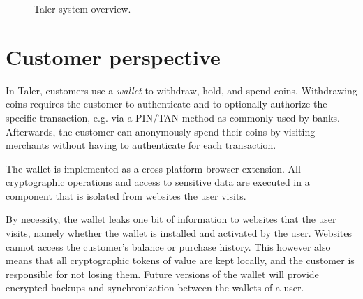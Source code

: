 \documentclass[twoside,letterpaper]{sigalternate}
\begin{document}
\begin{figure}[t!]
\centering
{}
\caption{Taler system overview.}
\label{fig:system}
\end{figure}

\section{Customer perspective}

In Taler, customers use a {\em wallet} to withdraw, hold, and spend coins.
Withdrawing coins requires the customer to authenticate and to optionally
authorize the specific transaction, e.g. via a PIN/TAN method as commonly used
by banks.  Afterwards, the customer can anonymously spend their coins by visiting
merchants without having to authenticate for each transaction.

The wallet is implemented as a cross-platform browser extension.  All
cryptographic operations and access to sensitive data are executed in a
component that is isolated from websites the user visits.

By necessity, the wallet leaks one bit of information to websites that the user
visits, namely whether the wallet is installed and activated by the user.
Websites cannot access the customer's balance or purchase history.  This
however also means that all cryptographic tokens of value are kept locally, and
the customer is responsible for not losing them.  Future versions of the wallet
will provide encrypted backups and synchronization between the wallets of a
user.
\end{document}
